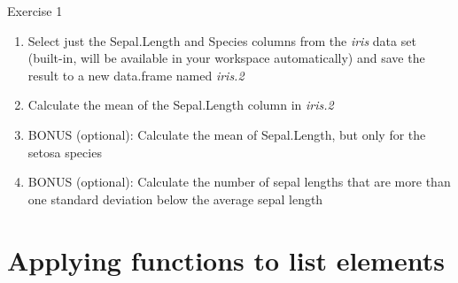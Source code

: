 \documentclass[table,smaller]{beamer}
\begin{document}
\begin{frame}[label=sec-3-7]{Exercise 1}
\begin{enumerate}
\item Select just the Sepal.Length and Species columns from the \emph{iris} data set (built-in, will be available in your workspace automatically) and save the result to a new data.frame named \emph{iris.2}
\item Calculate the mean of the Sepal.Length column in \emph{iris.2}
\item BONUS (optional): Calculate the mean of Sepal.Length, but only for the setosa species
\item BONUS (optional): Calculate the number of sepal lengths that are more than one standard deviation below the average sepal length
\end{enumerate}
\end{frame}
\section{Applying functions to list elements}
\label{sec-4}
\end{document}
